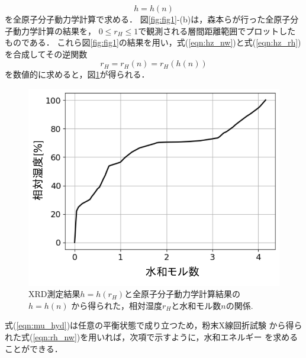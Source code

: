 \begin{equation}
	h=h(n)
	\label{eqn:hz_nw}
\end{equation}
を全原子分子動力学計算で求める．
図\ref{fig:fig1}-(b)は，森本ら\cite{Morimoto}が行った全原子分子動力学計算の結果を，
$0\leq r_H \leq 1$で観測される層間距離範囲でプロットしたものである．
これら図\ref{fig:fig1}の結果を用い，式(\ref{eqn:hz_nw})と式(\ref{eqn:hz_rh})
を合成してその逆関数
\begin{equation}
	r_H=r_H(n)=r_H(h(n))
	\label{eqn:rh_nw}
\end{equation}
を数値的に求めると，図\ref{fig:fig6}が得られる．
\begin{figure}[h]
	\begin{center}
	\includegraphics[width=0.6\linewidth]{Figs/fig6.pdf} 
	\end{center}
	\caption{
		XRD測定結果\(h=h(r_H)\)と全原子分子動力学計算結果の\(h=h(n)\)
		から得られた，相対湿度$r_H$と水和モル数$n$の関係.
	} 
	\label{fig:fig6}
\end{figure}
式(\ref{eqn:mu_hyd})は任意の平衡状態で成り立つため，粉末X線回折試験
から得られた式(\ref{eqn:rh_nw})を用いれば，次項で示すように，水和エネルギー
を求めることができる．
